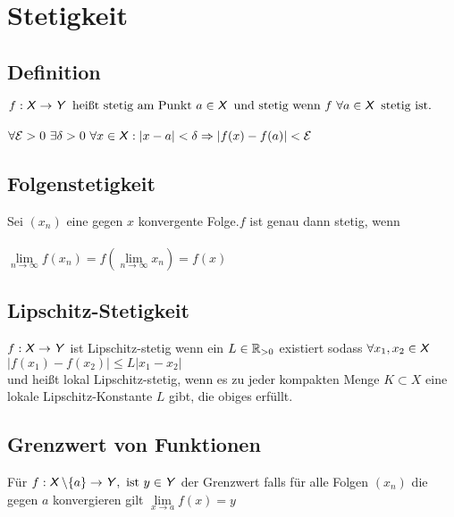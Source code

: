 \documentclass[german]{latex4ei/latex4ei_sheet}
\begin{document}
\section{Stetigkeit}

\begin{sectionbox}
	\subsection{Definition}
	$f:\operatorname{\textsf{\textit{X}}} \rightarrow \operatorname{\textsf{\textit{Y}}} \text{ heißt stetig am Punkt } a\in \operatorname{\textsf{\textit{X}}} \text{ und stetig wenn }f \text{  } \forall a \in \operatorname{\textsf{\textit{X}}} \text{ stetig ist.}$\\ \\
	$\forall \mathcal{E}>0 \text{  } \exists \delta >0 \text{  } \forall x \in \operatorname{\textsf{\textit{X}}} : |x-a|<\delta \Rightarrow |f(x)-f(a)|< \mathcal{E}$

	
\end{sectionbox}

\begin{sectionbox}
	\subsection{Folgenstetigkeit}
	Sei $(x_n)$ eine gegen $x$ konvergente Folge.$f$ ist genau dann stetig, wenn\\ \\
	$\lim \limits_{n \to \infty}f(x_n) = f(\lim \limits_{n \to \infty} x_n) = f(x)$

\end{sectionbox}


\begin{sectionbox}
	\subsection{Lipschitz-Stetigkeit}
	$f:\operatorname{\textsf{\textit{X}}} \rightarrow \operatorname{\textsf{\textit{Y}}}$ ist Lipschitz-stetig wenn ein $L \in \operatorname{\mathbb R}_{>0}$ existiert sodass $\forall x_1,x_2 \in \operatorname{\textsf{\textit{X}}}$\\
	$|f(x_1)-f(x_2)| \le L |x_1-x_2|$\\
	und heißt lokal Lipschitz-stetig, wenn es zu jeder kompakten Menge $K \subset X$ eine lokale Lipschitz-Konstante $L$ gibt, die obiges erfüllt.

\end{sectionbox}

\begin{sectionbox}
	\subsection{Grenzwert von Funktionen}
	Für $f:\operatorname{\textsf{\textit{X}}} \backslash \{a\} \rightarrow \operatorname{\textsf{\textit{Y}}}, \text{ ist } y \in \operatorname{\textsf{\textit{Y}}} $ der Grenzwert falls für alle Folgen $(x_n)$ die gegen $a$ konvergieren gilt $\lim \limits_{x \to a}f(x)=y$

\end{sectionbox}
\end{document}
